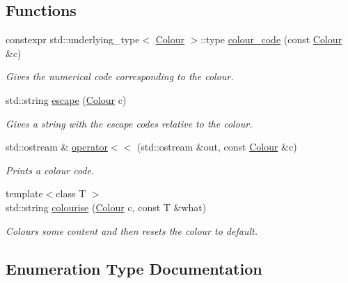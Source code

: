 \subsection*{Functions}
\begin{DoxyCompactItemize}
\item 
constexpr std\+::underlying\+\_\+type$<$ \hyperlink{namespaceas_1_1console_ab2f5a531e43f4ee9e0f348f8aa5ce16c}{Colour} $>$\+::type \hyperlink{namespaceas_1_1console_ae7e08b7053b857ff4d798c9860680ac7}{colour\+\_\+code} (const \hyperlink{namespaceas_1_1console_ab2f5a531e43f4ee9e0f348f8aa5ce16c}{Colour} \&c)
\begin{DoxyCompactList}\small\item\em Gives the numerical code corresponding to the colour. \end{DoxyCompactList}\item 
std\+::string \hyperlink{namespaceas_1_1console_a960fbc86f1ff964059acb44b12342199}{escape} (\hyperlink{namespaceas_1_1console_ab2f5a531e43f4ee9e0f348f8aa5ce16c}{Colour} c)
\begin{DoxyCompactList}\small\item\em Gives a string with the escape codes relative to the colour. \end{DoxyCompactList}\item 
std\+::ostream \& \hyperlink{namespaceas_1_1console_a05dafe6fcc36510443d4769ad4667652}{operator$<$$<$} (std\+::ostream \&out, const \hyperlink{namespaceas_1_1console_ab2f5a531e43f4ee9e0f348f8aa5ce16c}{Colour} \&c)
\begin{DoxyCompactList}\small\item\em Prints a colour code. \end{DoxyCompactList}\item 
{\footnotesize template$<$class T $>$ }\\std\+::string \hyperlink{namespaceas_1_1console_a64c8640b4ced55636cb8926b1640d6e9}{colourise} (\hyperlink{namespaceas_1_1console_ab2f5a531e43f4ee9e0f348f8aa5ce16c}{Colour} c, const T \&what)
\begin{DoxyCompactList}\small\item\em Colours some content and then resets the colour to default. \end{DoxyCompactList}\end{DoxyCompactItemize}


\subsection{Enumeration Type Documentation}
\mbox{\label{namespaceas_1_1console_ab2f5a531e43f4ee9e0f348f8aa5ce16c}} 
